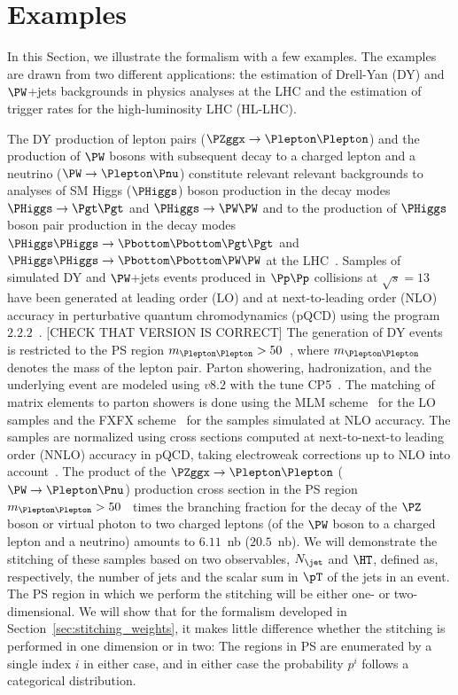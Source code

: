\section{Examples}
\label{sec:examples}

In this Section, we illustrate the formalism with a few examples.
The examples are drawn from two different applications: the estimation of Drell-Yan (DY) and $\PW$+jets backgrounds in physics analyses at the LHC
and the estimation of trigger rates for the high-luminosity LHC (HL-LHC).

The DY production of lepton pairs ($\PZggx \to \Plepton\Plepton$) and the production of $\PW$ bosons with subsequent decay to a charged lepton and a neutrino ($\PW \to \Plepton\Pnu$)
constitute relevant relevant backgrounds to analyses of SM Higgs ($\PHiggs$) boson production in the decay modes $\PHiggs \to \Pgt\Pgt$ and $\PHiggs \to \PW\PW$
and to the production of $\PHiggs$ boson pair production in the decay modes $\PHiggs\PHiggs \to \Pbottom\Pbottom\Pgt\Pgt$ and $\PHiggs\PHiggs \to \Pbottom\Pbottom\PW\PW$ 
at the LHC~\cite{ATLAS:2014aga,Aad:2015vsa,Aad:2019yxi,Aaboud:2018sfw,CMS-HIG-13-004,CMS-HIG-13-027,CMS-HIG-17-002,CMS-HIG-17-006}.
Samples of simulated DY and $\PW$+jets events produced in $\Pp\Pp$ collisions at $\sqrt{s}=13$~\TeV
have been generated at leading order (LO) and at next-to-leading order (NLO) accuracy in perturbative quantum chromodynamics (pQCD)
using the program \MGvATNLO $2.2.2$~\cite{Alwall:2014hca}. [CHECK THAT VERSION IS CORRECT]
The generation of DY events is restricted to the PS region $m_{\Plepton\Plepton} > 50$~\GeV, where $m_{\Plepton\Plepton}$ denotes the mass of the lepton pair.
Parton showering, hadronization, and the underlying event are modeled using \PYTHIA $v8.2$ with the tune \textrm{CP5}~\cite{Sirunyan:2019dfx}.
The matching of matrix elements to parton showers is done using the \textrm{MLM} scheme~\cite{Alwall:2007fs} for the LO samples
and the \textrm{FXFX} scheme~\cite{Frederix:2012ps} for the samples simulated at NLO accuracy.
The samples are normalized using cross sections computed at next-to-next-to leading order (NNLO) accuracy in pQCD,
taking electroweak corrections up to NLO into account~\cite{Li:2012wna}.
The product of the $\PZggx \to \Plepton\Plepton$ ($\PW \to \Plepton\Pnu$) production cross section in the PS region $m_{\Plepton\Plepton} > 50$~\GeV
times the branching fraction for the decay of the $\PZ$ boson or virtual photon to two charged leptons (of the $\PW$ boson to a charged lepton and a neutrino) amounts to $6.11$~nb ($20.5$~nb).
We will demonstrate the stitching of these samples based on two observables,
$N_{\jet}$ and $\HT$, defined as, respectively, the number of jets and the scalar sum in $\pT$ of the jets in an event.
The PS region in which we perform the stitching will be either one- or two-dimensional.
We will show that for the formalism developed in Section~\ref{sec:stitching_weights},
it makes little difference whether the stitching is performed in one dimension or in two:
The regions in PS are enumerated by a single index $i$ in either case,
and in either case the probability $p^{i}$ follows a categorical distribution.

